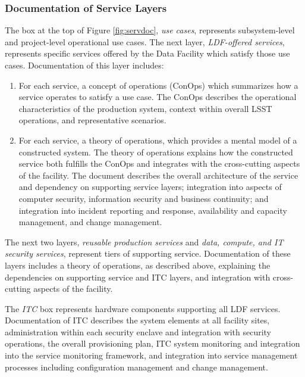 \subsubsection{Documentation of Service Layers}

The box at the top of Figure \ref{fig:servdoc}, \textit{use cases}, represents subsystem-level and project-level operational use cases. The next layer, \textit{LDF-offered services}, represents specific services offered by the Data Facility which satisfy those use cases. Documentation of this layer includes:

\begin{enumerate}
\item	For each service, a concept of operations (ConOps) which summarizes how a service operates to satisfy a use case. The ConOps describes the operational characteristics of the production system, context within overall \gls{LSST} operations, and representative scenarios. 
\item	For each service, a theory of operations, which provides a mental model of a constructed system. The theory of operations explains how the constructed service both fulfills the ConOps and integrates with the cross-cutting aspects of the facility. The document describes the overall architecture of the service and dependency on supporting service layers; integration into aspects of computer security, information security and business continuity; and integration into incident reporting and response, availability and capacity management, and change management.
\end{enumerate}

The next two layers, \textit{reusable production services} and \textit{data, compute, and \gls{IT} security services}, represent tiers of supporting service. Documentation of these layers includes a theory of operations, as described above, explaining the dependencies on supporting service and \gls{ITC} layers, and integration with cross-cutting aspects of the facility.

The \textit{ITC} box represents hardware components supporting all \gls{LDF} services. Documentation of \gls{ITC} describes the system elements at all facility sites, administration within each security enclave and integration with security operations, the overall provisioning plan, \gls{ITC} system \gls{monitoring} and integration into the service \gls{monitoring} framework, and integration into service management processes including \gls{configuration} management and change management.

